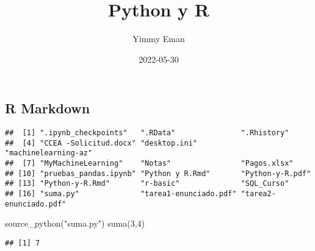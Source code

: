 \documentclass[
]{article}
\title{Python y R}
\author{Yimmy Eman}
\date{2022-05-30}
\newenvironment{Shaded}{\begin{snugshade}}{\end{snugshade}}
\newcommand{\AttributeTok}[1]{\textcolor[rgb]{0.77,0.63,0.00}{#1}}
\newcommand{\CommentTok}[1]{\textcolor[rgb]{0.56,0.35,0.01}{\textit{#1}}}
\newcommand{\ConstantTok}[1]{\textcolor[rgb]{0.00,0.00,0.00}{#1}}
\newcommand{\DecValTok}[1]{\textcolor[rgb]{0.00,0.00,0.81}{#1}}
\newcommand{\FunctionTok}[1]{\textcolor[rgb]{0.00,0.00,0.00}{#1}}
\newcommand{\NormalTok}[1]{#1}
\newcommand{\OtherTok}[1]{\textcolor[rgb]{0.56,0.35,0.01}{#1}}
\newcommand{\SpecialCharTok}[1]{\textcolor[rgb]{0.00,0.00,0.00}{#1}}
\newcommand{\StringTok}[1]{\textcolor[rgb]{0.31,0.60,0.02}{#1}}
\begin{document}
\maketitle

\hypertarget{r-markdown}{%
\subsection{R Markdown}\label{r-markdown}}

\begin{Shaded}
\end{Shaded}

\begin{verbatim}
##  [1] ".ipynb_checkpoints"   ".RData"               ".Rhistory"           
##  [4] "CCEA -Solicitud.docx" "desktop.ini"          "machinelearning-az"  
##  [7] "MyMachineLearning"    "Notas"                "Pagos.xlsx"          
## [10] "pruebas_pandas.ipynb" "Python y R.Rmd"       "Python-y-R.pdf"      
## [13] "Python-y-R.Rmd"       "r-basic"              "SQL_Curso"           
## [16] "suma.py"              "tarea1-enunciado.pdf" "tarea2-enunciado.pdf"
\end{verbatim}

\begin{Shaded}
\begin{Highlighting}[]
\FunctionTok{source\_python}\NormalTok{(}\StringTok{"suma.py"}\NormalTok{)}
\FunctionTok{suma}\NormalTok{(}\DecValTok{3}\NormalTok{,}\DecValTok{4}\NormalTok{)}
\end{Highlighting}
\end{Shaded}

\begin{verbatim}
## [1] 7
\end{verbatim}

\begin{Shaded}
\end{Shaded}
\end{document}
